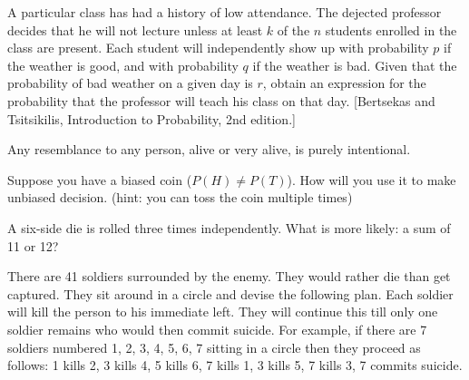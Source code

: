 \documentclass[solution,addpoints,12pt]{exam}
\begin{document}
\begin{questions}

\question[1] A particular class has had a history of low attendance. The dejected professor decides that he will not lecture unless at least $k$ of the $n$ students enrolled in the class are present. Each student will independently show up with probability
$p$ if the weather is good, and with probability $q$ if the weather is bad. Given that the probability of bad weather on a given day is $r$, obtain an expression for the probability that the professor will teach his class on that day. [Bertsekas and Tsitsikilis, Introduction to Probability, 2nd edition.]
\begin{solution}
Any resemblance to any person, alive or very alive, is purely intentional.
\end{solution}
 
\question[1] Suppose you have a biased coin ($P(H) \neq P(T)$). How will you use it to make unbiased decision. (hint: you can toss the coin multiple times)
\begin{solution}

\end{solution}


\question [1]
A six-side die is rolled three times independently. What is more likely: a sum of 11 or 12?
\begin{solution}

\end{solution}

\question[1] There are 41 soldiers surrounded by the enemy. They would rather die than get captured. They sit around in a circle and devise the following plan. Each soldier will kill the person to his immediate left. They will continue this till only one soldier remains who would then commit suicide. For example, if there are 7 soldiers numbered 1, 2, 3, 4, 5, 6, 7 sitting in a circle then they proceed as follows: 1 kills 2, 3 kills 4, 5 kills 6, 7 kills 1, 3 kills 5, 7 kills 3, 7 commits suicide. 


\end{questions}
\end{document}
